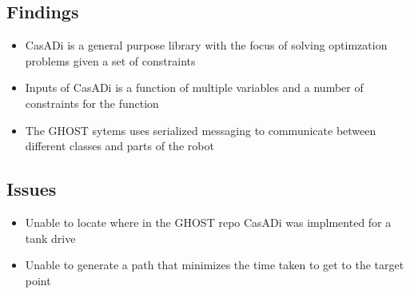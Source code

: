 \subsection*{Findings}
\begin{itemize}
    \item CasADi is a general purpose library with the focus of solving optimzation problems given a set of constraints
    \item Inputs of CasADi is a function of multiple variables and a number of constraints for the function
    \item The GHOST sytems uses serialized messaging to communicate between different classes and parts of the robot
\end{itemize}

\subsection*{Issues}
\begin{itemize}
    \item Unable to locate where in the GHOST repo CasADi was implmented for a tank drive
    \item Unable to generate a path that minimizes the time taken to get to the target point
\end{itemize}

